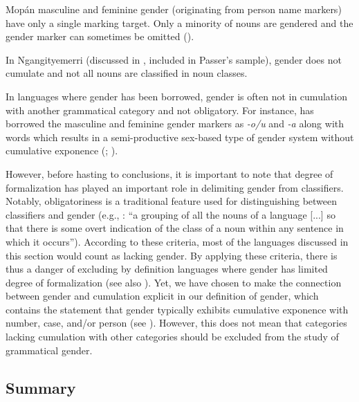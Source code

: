 \documentclass[output=collectionpaper]{langsci/langscibook}
\begin{document}
Mopán  masculine and feminine gender (originating from person name markers) have only a single marking target. Only a minority of nouns are gendered and the gender marker can sometimes be omitted (\citealt[133]{Contini-Morava2018}).

In Ngan\textquotesingle{}gityemerri (discussed in , included in Passer's sample), gender does not cumulate and not all nouns are classified in noun classes.

In languages where gender has been borrowed, gender is often not in cumulation with another grammatical category and not obligatory. For instance,  has borrowed the  masculine and feminine gender markers as \textit{-o/u} and \textit{-a} along with  words which results in a semi-productive sex-based type of gender system without cumulative exponence (\citealt{Stolz2012}; ).

However, before hasting to conclusions, it is important to note that degree of formalization has played an important role in delimiting gender from classifiers. Notably, obligatoriness is a traditional feature used for distinguishing between classifiers and gender (e.g., \citealt[160]{Dixon1982}: ``a grouping of all the nouns of a language [...] so that there is some overt indication of the class of a noun within any sentence in which it occurs''). According to these criteria, most of the languages discussed in this section would count as lacking gender. By applying these criteria, there is thus a danger of excluding by definition languages where gender has limited degree of formalization (see also ). Yet, we have chosen to make the connection between gender and cumulation explicit in our definition of gender, which contains the statement that gender typically exhibits cumulative exponence with number, case, and/or person (see ). However, this does not mean that categories lacking cumulation with other categories should be excluded from the study of grammatical gender.

  \subsection{Summary}
\end{document}
